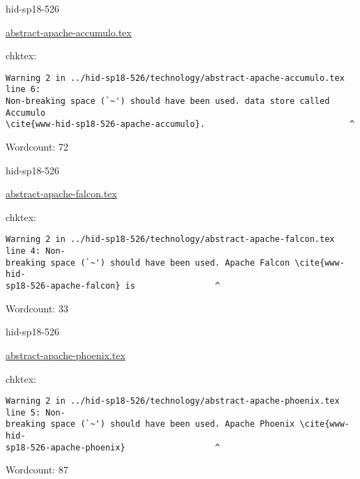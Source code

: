 

\begin{IU}

hid-sp18-526

\href{https://github.com/cloudmesh-community/hid-sp18-526/blob/master//technology/abstract-apache-accumulo.tex}{abstract-apache-accumulo.tex}

 
chktex:
\begin{tiny}
\begin{verbatim}
Warning 2 in ../hid-sp18-526/technology/abstract-apache-accumulo.tex line 6:
Non-breaking space (`~') should have been used. data store called Accumulo
\cite{www-hid-sp18-526-apache-accumulo}.                             ^
\end{verbatim}
\end{tiny}

Wordcount: 72

\end{IU}



\begin{IU}

hid-sp18-526

\href{https://github.com/cloudmesh-community/hid-sp18-526/blob/master//technology/abstract-apache-falcon.tex}{abstract-apache-falcon.tex}

 
chktex:
\begin{tiny}
\begin{verbatim}
Warning 2 in ../hid-sp18-526/technology/abstract-apache-falcon.tex line 4: Non-
breaking space (`~') should have been used. Apache Falcon \cite{www-hid-
sp18-526-apache-falcon} is                ^
\end{verbatim}
\end{tiny}

Wordcount: 33

\end{IU}



\begin{IU}

hid-sp18-526

\href{https://github.com/cloudmesh-community/hid-sp18-526/blob/master//technology/abstract-apache-phoenix.tex}{abstract-apache-phoenix.tex}

 
chktex:
\begin{tiny}
\begin{verbatim}
Warning 2 in ../hid-sp18-526/technology/abstract-apache-phoenix.tex line 5: Non-
breaking space (`~') should have been used. Apache Phoenix \cite{www-hid-
sp18-526-apache-phoenix}                  ^
\end{verbatim}
\end{tiny}

Wordcount: 87

\end{IU}

